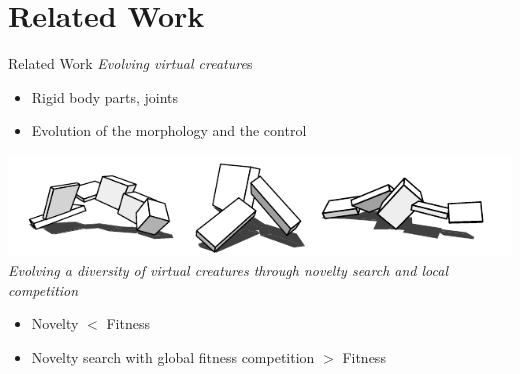 \documentclass[6pt]{beamer}
\begin{document}
\section{Related Work}

\begin{frame}{Related Work}
\textit{Evolving virtual creature}s~
\begin{itemize}
\item Rigid body parts, joints
\item Evolution of the morphology and the control
\end{itemize}
{\centering
\includegraphics[scale=0.4]{../Figures/Misc/evolvingVirtualCreatures.png}}\\
\textit{Evolving a diversity of virtual creatures through novelty search and local competition} ~
\begin{itemize}
\item Novelty $<$ Fitness
\item Novelty search with global fitness competition $>$ Fitness
\end{itemize}
\end{frame}
\end{document}
